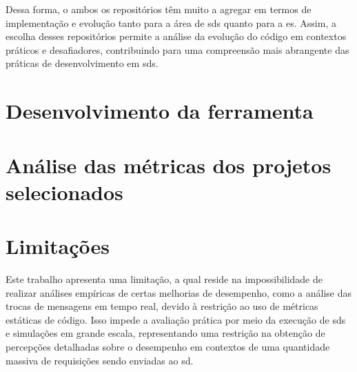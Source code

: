 Dessa forma, o ambos os repositórios têm muito a agregar em termos de implementação e evolução tanto para a área de \gls{sds} quanto para a \gls{es}. Assim, a escolha desses repositórios permite a análise da evolução do código em contextos práticos e desafiadores, contribuindo para uma compreensão mais abrangente das práticas de desenvolvimento em \gls{sds}.

\section{Desenvolvimento da ferramenta}

\section{Análise das métricas dos projetos selecionados}

\section{Limitações}
\label{sec:limitacoes}

Este trabalho apresenta uma limitação, a qual reside na impossibilidade de realizar análises empíricas de certas melhorias de desempenho, como a análise das trocas de mensagens em tempo real, devido à restrição ao uso de métricas estáticas de código. Isso impede a avaliação prática por meio da execução de \gls{sds} e simulações em grande escala, representando uma restrição na obtenção de percepções detalhadas sobre o desempenho em contextos de uma quantidade massiva de requisições sendo enviadas ao \gls{sd}.